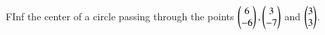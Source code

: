 \begin{flushleft}
FInf the center of a circle passing through the points $\begin{pmatrix}6\\-6\end{pmatrix}, \begin{pmatrix}3\\-7\end{pmatrix}$ and $\begin{pmatrix}3\\3\end{pmatrix}$.
\end{flushleft}
